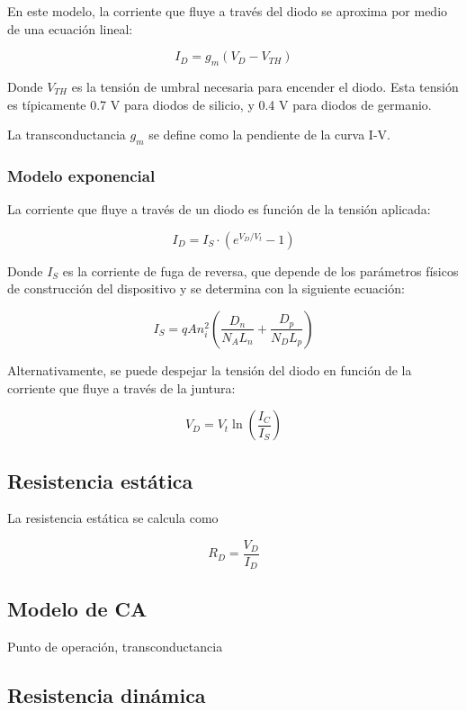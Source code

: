 En este modelo, la corriente que fluye a través del diodo se aproxima por medio de una ecuación lineal:

\[ I_D = g_m (V_D - V_{TH}) \]

Donde $V_{TH}$ es la tensión de umbral necesaria para encender el diodo. Esta tensión es típicamente 0.7 V para diodos de silicio, y 0.4 V para diodos de germanio.

La transconductancia $g_m$ se define como la pendiente de la curva I-V. 


\subsubsection{Modelo exponencial}

La corriente que fluye a través de un diodo es función de la tensión aplicada:

\[ I_D = I_S \cdot (e^{V_D/V_t} - 1) \]

Donde $I_S$ es la corriente de fuga de reversa, que depende de los parámetros físicos de construcción del dispositivo y se determina con la siguiente ecuación:

\[ I_S = q A n_i^2 \left( \dfrac{D_n}{N_A L_n} + \dfrac{D_p}{N_D L_p} \right) \]

Alternativamente, se puede despejar la tensión del diodo en función de la corriente que fluye a través de la juntura:

\[ V_D = V_t \ln \left( \dfrac{I_C}{I_S} \right) \]



\subsection{Resistencia estática}

La resistencia estática se calcula como

\[ R_D = \dfrac{V_D}{I_D} \]

\subsection{Modelo de CA}

Punto de operación, transconductancia


\subsection{Resistencia dinámica}

